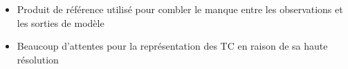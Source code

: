 \documentclass[aspectratio=169, usepdftitle=false, xcolor={dvipsnames}, 9pt,table]{beamer}
\begin{document}
\begin{frame}[t]
\begin{columns}[t]
\begin{column}{0.5\textwidth}
{\begin{block}
                    \begin{itemize}
                        \footnotesize
                        \item Produit de référence utilisé pour combler le manque entre les observations et les sorties de modèle 
                        \item Beaucoup d'attentes pour la représentation des TC en raison de sa haute résolution
                    \end{itemize}
                \end{block}
            }
        \end{column}
    \end{columns}
\end{frame}

\end{document}
